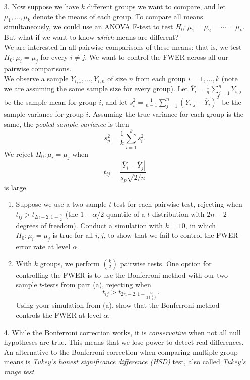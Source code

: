 \documentclass[11pt]{article}
\begin{document}
\begin{enumerate}
\item[3.] Now suppose we have $k$ different groups we want to compare, and let $\mu_1,...,\mu_k$ denote the means of each group. To compare all means simultaneously, we could use an ANOVA F-test to test $H_0: \mu_1 = \mu_2 = \cdots = \mu_k$. But what if we want to know \textit{which} means are different? \\

We are interested in all pairwise comparisons of these means: that is, we test $H_0: \mu_i = \mu_j$ for every $i \neq j$. We want to control the FWER across all our pairwise comparisons.\\

We observe a sample $Y_{i,1},...,Y_{i,n}$ of size $n$ from each group $i =1,...,k$ (note we are assuming the same sample size for every group). Let $\overline{Y}_i = \frac{1}{n} \sum \limits_{j=1}^n Y_{i,j}$ be the sample mean for group $i$, and let $s_i^2 = \frac{1}{n-1} \sum \limits_{j=1}^n (Y_{i,j} - \overline{Y}_i)^2$ be the sample variance for group $i$. Assuming the true variance for each group is the same, the \textit{pooled sample variance} is then
$$s_p^2 = \frac{1}{k} \sum \limits_{i=1}^k s_i^2 .$$
We reject $H_0: \mu_i = \mu_j$ when
$$t_{ij} = \dfrac{|\overline{Y}_i - \overline{Y}_j|}{s_p \sqrt{2/n}}$$
is large.\\

\begin{enumerate}
\item Suppose we use a two-sample $t$-test for each pairwise test, rejecting when $t_{ij} > t_{2n - 2, 1 - \frac{\alpha}{2}}$ (the $1 - \alpha/2$ quantile of a $t$ distribution with $2n - 2$ degrees of freedom). Conduct a simulation with $k = 10$, in which $H_0: \mu_i = \mu_j$ is true for all $i,j$, to show that we fail to control the FWER error rate at level $\alpha$.

\item With $k$ groups, we perform ${k \choose 2}$ pairwise tests. One option for controlling the FWER is to use the Bonferroni method with our two-sample $t$-tests from part (a), rejecting when 
$$t_{ij} > t_{2n - 2, 1 - \frac{\alpha}{2 {k \choose 2}}}.$$
Using your simulation from (a), show that the Bonferroni method controls the FWER at level $\alpha$.
\end{enumerate}

\item[4.] While the Bonferroni correction works, it is \textit{conservative} when not all null hypotheses are true. This means that we lose power to detect real differences. An alternative to the Bonferroni correction when comparing multiple group means is \textit{Tukey's honest significance difference (HSD)} test, also called \textit{Tukey's range test}.\\


\end{enumerate}
\end{document}
